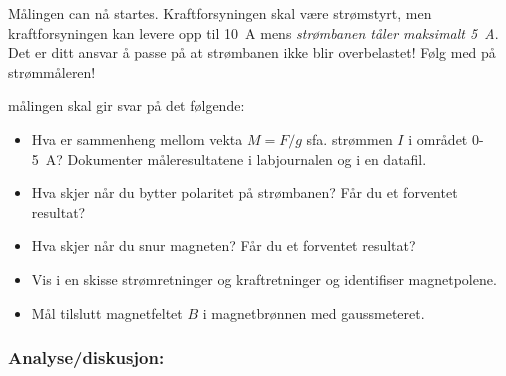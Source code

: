 \documentclass[../Elmag-labhefte-2020.tex]{subfiles}
\begin{document}
Målingen can nå startes. Kraftforsyningen skal være strømstyrt, men kraftforsyningen kan levere opp til \SI{10}{\ampere} mens \emph{strømbanen tåler maksimalt \SI{5}{\ampere}}. Det er ditt ansvar å passe på at strømbanen ikke blir overbelastet! Følg med på strømmåleren!

målingen skal gir svar på det følgende:
\begin{itemize}
        \item Hva er sammenheng mellom vekta $M  = F/g$ sfa. strømmen $I$ i området 0-\SI{5}{\ampere}? Dokumenter måleresultatene i labjournalen og i en datafil. 
        \item Hva skjer når du bytter polaritet på strømbanen? Får du et forventet resultat? 
    \item Hva skjer når du snur magneten?  Får du et forventet resultat? 
    \item Vis i en skisse strømretninger og kraftretninger og identifiser magnetpolene.
    \item Mål tilslutt magnetfeltet $B$ i magnetbrønnen med gaussmeteret.
\end{itemize}

\subsubsection{Analyse/diskusjon:}
\end{document}
